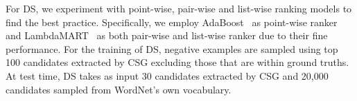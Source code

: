 For DS, we experiment with point-wise, pair-wise and list-wise ranking models to find the best practice.
Specifically, we employ AdaBoost~\cite{freund1997decision} as point-wise ranker and LambdaMART~\cite{burges2010from} as both pair-wise and list-wise ranker due to their fine performance. For the training of DS, negative examples are sampled using top 100 candidates extracted by CSG excluding those that are within ground truths. At test time, DS takes as input 30 candidates extracted by CSG 
and 20,000 candidates sampled from WordNet's own vocabulary.





